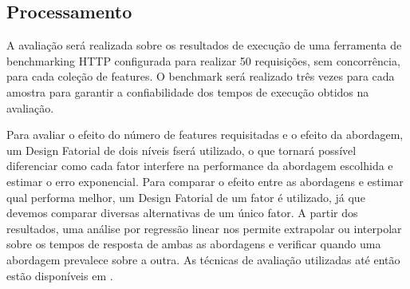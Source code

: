 \subsection{Processamento}

A avaliação será realizada sobre os resultados de execução de uma ferramenta de benchmarking HTTP configurada para realizar 50 requisições, sem concorrência, para cada coleção de features. O benchmark será realizado três vezes para cada amostra para garantir a confiabilidade dos tempos de execução obtidos na avaliação.

Para avaliar o efeito do número de features requisitadas e o efeito da abordagem, um Design Fatorial de dois níveis fserá utilizado, o que tornará possível diferenciar como cada fator interfere na performance da abordagem escolhida e estimar o erro exponencial. Para comparar o efeito entre as abordagens e estimar qual performa melhor, um Design Fatorial de um fator é utilizado, já que devemos comparar diversas alternativas de um único fator. A partir dos resultados, uma análise por regressão linear nos permite extrapolar ou interpolar sobre os tempos de resposta de ambas as abordagens e verificar quando uma abordagem prevalece sobre a outra. As técnicas de avaliação utilizadas até então estão disponíveis em \cite{bukh1992art}.

